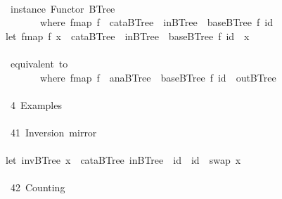 \documentclass[a4paper]{article}
\begin{document}
\begin{tabbing}
\ttfamily ~\\
\ttfamily ~~instance~Functor~BTree\\
\ttfamily ~~~~~~~~where~fmap~f~~cataBTree~~inBTree~~baseBTree~f~id~\\
\ttfamily ~let~fmap~f~x~~cataBTree~~inBTree~~baseBTree~f~id~~x\\
\ttfamily ~\\
\ttfamily ~~equivalent~to\\
\ttfamily ~~~~~~~~where~fmap~f~~anaBTree~~baseBTree~f~id~~outBTree~\\
\ttfamily ~\\
\ttfamily ~~4~Examples~\\
\ttfamily ~\\
\ttfamily ~~41~Inversion~mirror~\\
\ttfamily ~\\
\ttfamily ~let~invBTree~x~~cataBTree~inBTree~~id~~id~~swap~x\\
\ttfamily ~\\
\ttfamily ~~42~Counting~\\

\end{tabbing}
\end{document}
